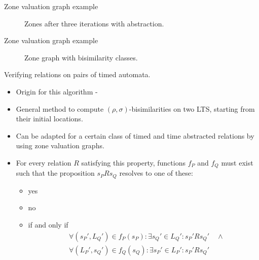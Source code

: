 \documentclass{beamer}
\begin{document}
\begin{frame}[shrink=20]{Zone valuation graph example}
  \begin{figure}
    \centering
    \def\svgwidth{1.2\columnwidth}
    
    \caption{Zones after three iterations with abstraction.}
  \end{figure}
\end{frame}

\begin{frame}[shrink=60]{Zone valuation graph example}
  \begin{figure}
    \centering
    \def\svgwidth{2.7\columnwidth}
    
    \caption{Zone graph with bisimilarity classes.}
  \end{figure}
\end{frame}

\begin{frame}{Verifying relations on pairs of timed automata.}
  \begin{itemize}
  \item Origin for this algorithm - \cite{arun2006bisimilarities} 
  \item General method to compute $(\rho, \sigma)$-bisimilarities on
    two LTS, starting from their initial locations.
  \item Can be adapted for a certain class of timed and time
    abstracted relations by using zone valuation graphs.
  \item For every relation $R$ satisfying this property, functions
    $f_P$ and $f_Q$ must exist such that the proposition $s_P R s_Q$
    resolves to one of these:
    \begin{itemize}
    \item yes
    \item no
    \item if and only if 
      \begin{align*} 
        &\forall (s_P', L_Q') \in f_P(s_P): \exists s_Q' \in
        L_Q': s_P' R s_Q' \quad \wedge \\
        &\forall (L_P', s_Q') \in f_Q(s_Q): \exists s_P' \in
        L_P': s_P' R s_Q'
      \end{align*} 
    \end{itemize}
  \end{itemize}
\end{frame}
\end{document}
